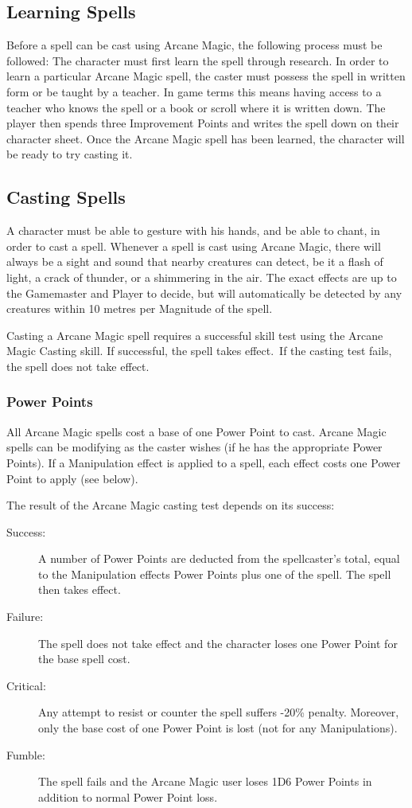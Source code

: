 \subsection{Learning Spells}
Before a spell can be cast using Arcane Magic, the following process must be followed:
The character must first learn the spell through research. In order to learn a particular Arcane Magic spell, the caster must possess the spell in written form or be taught by a teacher. In game terms this means having access to a teacher who knows the spell or a book or scroll where it is written down. The player then spends three Improvement Points and writes the spell down on their character sheet. Once the Arcane Magic spell has been learned, the character will be ready to try casting it.



\subsection{Casting Spells}
A character must be able to gesture with his hands, and be able to chant, in order to cast a spell. Whenever a spell is cast using Arcane Magic, there will always be a sight and sound that nearby creatures can detect, be it a flash of light, a crack of thunder, or a shimmering in the air. The exact effects are up to the Gamemaster and Player to decide, but will automatically be detected by any creatures within 10 metres per Magnitude of the spell. 

Casting a Arcane Magic spell requires a successful skill test using the Arcane Magic Casting skill. If successful, the spell takes effect. If the casting test fails, the spell does not take effect. 

\subsubsection{Power Points}
All Arcane Magic spells cost a base of one Power Point to cast. Arcane Magic spells can be modifying as the caster wishes (if he has the appropriate Power Points). If a Manipulation effect is applied to a spell, each effect costs one Power Point to apply (see below). 

The result of the Arcane Magic casting test depends on its success:
\begin{description}
	\item[Success:] A number of Power Points are deducted from the spellcaster’s total, equal to the Manipulation effects Power Points plus one of the spell. The spell then takes effect.
	\item[Failure:] The spell does not take effect and the character loses one Power Point for the base spell cost.
	\item[Critical:] Any attempt to resist or counter the spell suffers -20\% penalty. Moreover, only the base cost of one Power Point is lost (not for any Manipulations).
	\item[Fumble:] The spell fails and the Arcane Magic user loses 1D6 Power Points in addition to normal Power Point loss.
\end{description}

